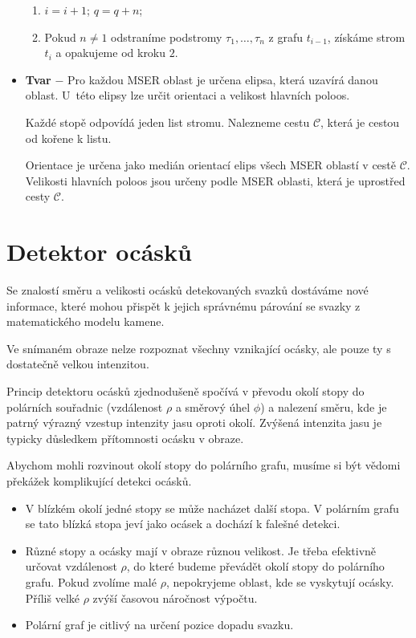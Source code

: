 \begin{itemize}
\begin{enumerate}
	\item $i = i+1$; $q = q+n$;
	\item Pokud $n \neq 1$ odstraníme podstromy $\tau_1,\dots,\tau_n$ z grafu $t_{i-1}$, získáme strom  $t_i$ a opakujeme od kroku $2$. 
	
\end{enumerate}	
	\item \textbf{Tvar} $-$  Pro každou MSER oblast je určena elipsa, která uzavírá danou oblast. U~této elipsy lze určit orientaci a velikost hlavních poloos. 
	
	Každé stopě odpovídá jeden list stromu. Nalezneme cestu $\mathcal{C}$, která je cestou od kořene k listu. 	
	
	Orientace je určena jako medián orientací elips všech MSER oblastí v cestě $\mathcal{C}$. Velikosti hlavních poloos jsou určeny podle MSER oblasti, která je uprostřed cesty $\mathcal{C}$.		
		
\end{itemize}

\newpage
\section{Detektor ocásků}
\label{sec:tails}
	Se znalostí směru a velikosti ocásků detekovaných svazků dostáváme nové informace, které mohou přispět k jejich správnému párování se svazky z matematického modelu kamene.
	
	Ve snímaném obraze nelze rozpoznat všechny vznikající ocásky, ale pouze ty s dostatečně velkou intenzitou.

	Princip detektoru ocásků zjednodušeně spočívá v převodu okolí stopy do polárních sou\-řad\-nic (vzdálenost $\rho$ a směrový úhel $\phi$) a nalezení směru, kde je patrný výrazný vzestup intenzity jasu oproti okolí. Zvýšená intenzita jasu je typicky důsledkem přítomnosti ocásku v obraze. 
	
	Abychom mohli rozvinout okolí stopy do polárního grafu, musíme si být vědomi překážek komplikující detekci ocásků.
	  
	 \begin{itemize}	 	
	 	\item V blízkém okolí jedné stopy se může nacházet další stopa. V polárním grafu se tato blízká stopa jeví jako ocásek a dochází k falešné detekci.	
	 	\item Různé stopy a ocásky mají v obraze různou velikost. Je třeba efektivně určovat vzdálenost $\rho$, do které budeme převádět okolí stopy do polárního grafu. Pokud zvolíme malé $\rho$, nepokryjeme oblast, kde se vyskytují ocásky. Příliš velké $\rho$ zvýší časovou náročnost výpočtu.   	
	 	\item Polární graf je citlivý na určení pozice dopadu svazku. 
	\end{itemize}
	
